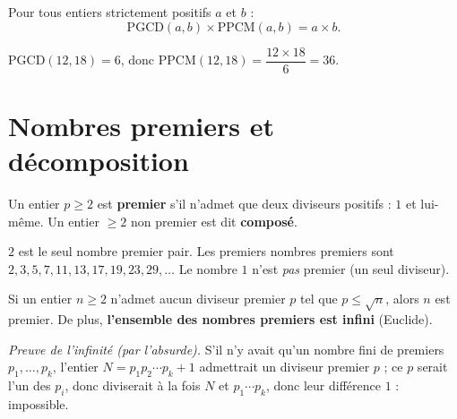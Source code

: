 \begin{theoreme}
Pour tous entiers strictement positifs $a$ et $b$ :
\[
\mathrm{PGCD}(a,b)\times\mathrm{PPCM}(a,b)=a\times b.
\]
\end{theoreme}

\begin{exemple}
$\mathrm{PGCD}(12,18)=6$, donc $\mathrm{PPCM}(12,18)=\dfrac{12\times 18}{6}=36$.
\end{exemple}

\section{Nombres premiers et décomposition}

\begin{definition}
Un entier $p\ge 2$ est \textbf{premier} s'il n'admet que deux diviseurs positifs : $1$ et lui-même. Un entier $\ge 2$ non premier est dit \textbf{composé}.
\end{definition}

\begin{remarque}
$2$ est le seul nombre premier pair. Les premiers nombres premiers sont $2,3,5,7,11,13,17,19,23,29,\dots$ Le nombre $1$ n'est \emph{pas} premier (un seul diviseur).
\end{remarque}

\begin{theoreme}
Si un entier $n\ge 2$ n'admet aucun diviseur premier $p$ tel que $p\le\sqrt n$, alors $n$ est premier. De plus, \textbf{l'ensemble des nombres premiers est infini} (Euclide).
\end{theoreme}

\begin{remarque}
\emph{Preuve de l'infinité (par l'absurde).} S'il n'y avait qu'un nombre fini de premiers $p_1,\dots,p_k$, l'entier $N=p_1 p_2\cdots p_k+1$ admettrait un diviseur premier $p$ ; ce $p$ serait l'un des $p_i$, donc diviserait à la fois $N$ et $p_1\cdots p_k$, donc leur différence $1$ : impossible.
\end{remarque}

\begin{illus}
\end{illus}

